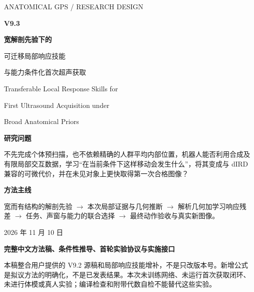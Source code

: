 \documentclass[UTF8,fontset=fandol,11pt,a4paper]{ctexart}
\theoremstyle{plain}
\theoremstyle{definition}
\theoremstyle{remark}
\numberwithin{equation}{section}
\begin{document}
\begin{titlepage}
\vspace*{6mm}
{\Large\sffamily\color{accent}ANATOMICAL GPS / RESEARCH DESIGN}\par
\vspace{13mm}
{\fontsize{38}{44}\selectfont\bfseries\color{ink}V9.3}\par
\vspace{9mm}
{\fontsize{24}{34}\selectfont\bfseries\color{ink}宽解剖先验下的\par 可迁移局部响应技能}\par
\vspace{5mm}
{\Large 与能力条件化首次超声获取}\par
\vspace{9mm}
{\large Transferable Local Response Skills for\par First Ultrasound Acquisition under\par Broad Anatomical Priors}\par
\vspace{10mm}
\begin{corebox}
\textbf{研究问题}\par
不先完成个体预扫描，也不依赖精确的人群平均内部位置，机器人能否利用合成及有限局部交互数据，学习“在当前条件下这样移动会发生什么”，将其变成与 dIRD 兼容的可微代价，并在未见对象上更快取得第一次合格图像？
\medskip\par
\textbf{方法主线}\par
宽而有结构的解剖先验 $\rightarrow$ 本次局部证据与几何推断 $\rightarrow$ 解析几何加学习响应残差 $\rightarrow$ 任务、声窗与能力的联合选择 $\rightarrow$ 最终动作验收与真实新图像。
\end{corebox}
\vfill
2026 年 11 月 10 日\par
\vspace{3mm}
\textbf{完整中文方法稿、条件性推导、首轮实验协议与实施接口}\par
\vspace{4mm}
{\small 本稿整合用户提供的 V9.2 源稿和局部响应技能增补，不是只改版本号。新增公式是拟议方法的明确化，不是已发表结果。本次未训练网络、未运行首次获取闭环、未进行体模或真人实验；编译检查和附带代数自检不能替代这些实验。}
\end{titlepage}
\end{document}
